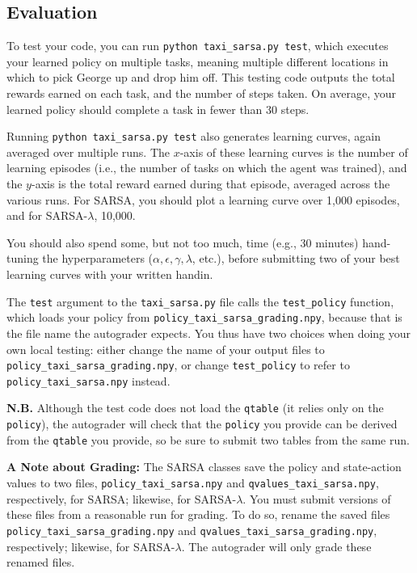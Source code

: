 \documentclass{article}
\begin{document}
\subsection{Evaluation}
To test your code, you can run \texttt{python taxi\_sarsa.py test},
which executes your learned policy on multiple tasks, meaning multiple
different locations in which to pick George up and drop him off.  This
testing code outputs the total rewards earned on each task, and the
number of steps taken.  On average, your learned policy should
complete a task in fewer than 30 steps.

Running \texttt{python taxi\_sarsa.py test} also generates learning
curves, again averaged over multiple runs.  The $x$-axis of these
learning curves is the number of learning episodes (i.e., the number
of tasks on which the agent was trained), and the $y$-axis is the
total reward earned during that episode, averaged across the various
runs.  For SARSA, you should plot a learning curve over 1,000
episodes, and for SARSA-$\lambda$, 10,000.

You should also spend some, but not too much, time (e.g., 30 minutes)
hand-tuning the hyperparameters ($\alpha, \epsilon, \gamma, \lambda$,
etc.), before submitting two of your best learning curves with your
written handin.

The \texttt{test} argument to the \texttt{taxi\_sarsa.py} file
calls the \texttt{test\_policy} function, which
loads your policy from
\texttt{policy\_taxi\_sarsa\_grading.npy},
because that is the file name the autograder expects.
You thus have two choices when doing your own local testing:
either change the name of your output files to \\
\texttt{policy\_taxi\_sarsa\_grading.npy},
or change \texttt{test\_policy} to refer to
\texttt{policy\_taxi\_sarsa.npy} instead.

\textbf{N.B.}
Although the test code does not load the \texttt{qtable} (it relies
only on the \texttt{policy}), the autograder will check that the
\texttt{policy} you provide can be derived from the \texttt{qtable}
you provide, so be sure to submit two tables from the same run.

\vspace{2.5mm}

\textbf{A Note about Grading:}
The SARSA classes save the policy and state-action values to two
files, \texttt{policy\_taxi\_sarsa.npy} and
\texttt{qvalues\_taxi\_sarsa.npy}, respectively, for SARSA; likewise,
for SARSA-$\lambda$.  You must submit versions of these files from a
reasonable run for grading.  To do so, rename the saved files
\texttt{policy\_taxi\_sarsa\_grading.npy} and
\texttt{qvalues\_taxi\_sarsa\_grading.npy}, respectively; likewise,
for SARSA-$\lambda$.  The autograder will only grade these renamed
files.
\end{document}
